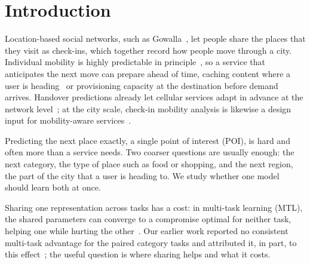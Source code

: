 \section{Introduction}
\label{sec:intro}

Location-based social networks, such as Gowalla~\cite{cho2011gowalla}, let people share the places that they visit as check-ins, which together record how people move through a city. Individual mobility is highly predictable in principle~\cite{song2010limits}, so a service that anticipates the next move can prepare ahead of time, caching content where a user is heading~\cite{bastug2014edge} or provisioning capacity at the destination before demand arrives. Handover predictions already let cellular services adapt in advance at the network level~\cite{vielhaus2022handover}; at the city scale, check-in mobility analysis is likewise a design input for mobility-aware services~\cite{moura2025mobilityaware}.

Predicting the next place exactly, a single point of interest (POI), is hard and often more than a service needs. Two coarser questions are usually enough: the next category, the type of place such as food or shopping, and the next region, the part of the city that a user is heading to. We study whether one model should learn both at once.

Sharing one representation across tasks has a cost: in multi-task learning (MTL), the shared parameters can converge to a compromise optimal for neither task, helping one while hurting the other~\cite{caruana1997multitask}. Our earlier
work reported no consistent multi-task advantage for the paired category tasks and attributed it, in part, to this effect~\cite{silva2025mtlnet}; the useful question is where sharing helps and what it costs.

